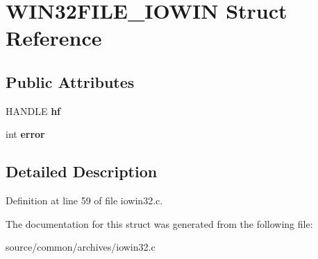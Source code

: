 \hypertarget{struct_w_i_n32_f_i_l_e___i_o_w_i_n}{\section{W\-I\-N32\-F\-I\-L\-E\-\_\-\-I\-O\-W\-I\-N Struct Reference}
\label{struct_w_i_n32_f_i_l_e___i_o_w_i_n}
}
\subsection*{Public Attributes}
\begin{DoxyCompactItemize}
\item 
\hypertarget{struct_w_i_n32_f_i_l_e___i_o_w_i_n_aef23f62010af57376fd452e88c602214}{H\-A\-N\-D\-L\-E {\bfseries hf}}\label{struct_w_i_n32_f_i_l_e___i_o_w_i_n_aef23f62010af57376fd452e88c602214}

\item 
\hypertarget{struct_w_i_n32_f_i_l_e___i_o_w_i_n_a074fe7f1d96aad43a9e2a4c575dfebb9}{int {\bfseries error}}\label{struct_w_i_n32_f_i_l_e___i_o_w_i_n_a074fe7f1d96aad43a9e2a4c575dfebb9}

\end{DoxyCompactItemize}


\subsection{Detailed Description}


Definition at line 59 of file iowin32.\-c.



The documentation for this struct was generated from the following file\-:\begin{DoxyCompactItemize}
\item 
source/common/archives/iowin32.\-c\end{DoxyCompactItemize}
